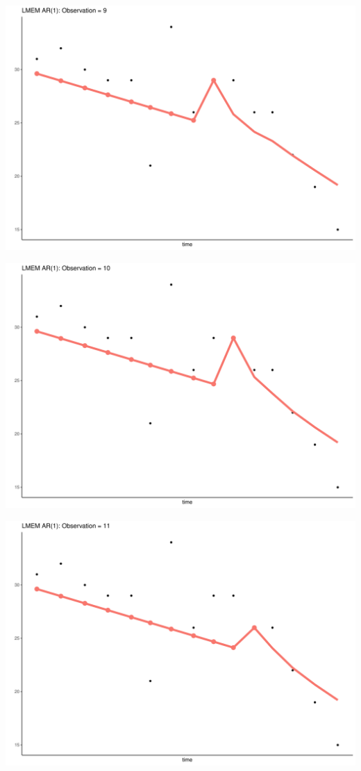\documentclass[
  ignorenonframetext,
]{beamer}
\begin{document}
\begin{frame}{}
\protect\hypertarget{section-23}{}
\includegraphics{Prez4_files/figure-beamer/unnamed-chunk-14-9.pdf}
\end{frame}

\begin{frame}{}
\protect\hypertarget{section-24}{}
\includegraphics{Prez4_files/figure-beamer/unnamed-chunk-14-10.pdf}
\end{frame}

\begin{frame}{}
\protect\hypertarget{section-25}{}
\includegraphics{Prez4_files/figure-beamer/unnamed-chunk-14-11.pdf}
\end{frame}
\end{document}
